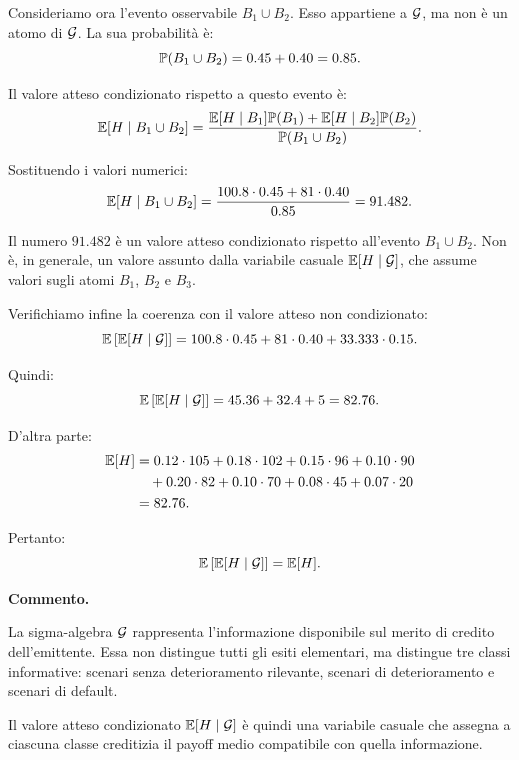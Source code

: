 Consideriamo ora l'evento osservabile $B_1\cup B_2$. Esso appartiene a
$\mathcal{G}$, ma non \`{e} un atomo di $\mathcal{G}$. La sua probabilit\`{a}
\`{e}:
\[
\mathbb{P}(B_1\cup B_2)
=
0.45+0.40
=
0.85.
\]

Il valore atteso condizionato rispetto a questo evento \`{e}:
\[
\mathbb{E}[H\mid B_1\cup B_2]
=
\frac{
\mathbb{E}[H\mid B_1]\mathbb{P}(B_1)
+
\mathbb{E}[H\mid B_2]\mathbb{P}(B_2)
}
{
\mathbb{P}(B_1\cup B_2)
}.
\]

Sostituendo i valori numerici:
\[
\mathbb{E}[H\mid B_1\cup B_2]
=
\frac{
100.8\cdot0.45
+
81\cdot0.40
}
{0.85}
=
91.482.
\]

Il numero $91.482$ \`{e} un valore atteso condizionato rispetto all'evento
$B_1\cup B_2$. Non \`{e}, in generale, un valore assunto dalla variabile
casuale $\mathbb{E}[H\mid\mathcal{G}]$, che assume valori sugli atomi
$B_1$, $B_2$ e $B_3$.

Verifichiamo infine la coerenza con il valore atteso non condizionato:
\[
\mathbb{E}\left[
\mathbb{E}[H\mid\mathcal{G}]
\right]
=
100.8\cdot0.45
+
81\cdot0.40
+
33.333\cdot0.15.
\]

Quindi:
\[
\mathbb{E}\left[
\mathbb{E}[H\mid\mathcal{G}]
\right]
=
45.36+32.4+5
=
82.76.
\]

D'altra parte:
\[
\begin{aligned}
\mathbb{E}[H]
&=
0.12\cdot105
+
0.18\cdot102
+
0.15\cdot96
+
0.10\cdot90 \\
&\quad
+
0.20\cdot82
+
0.10\cdot70
+
0.08\cdot45
+
0.07\cdot20 \\
&=
82.76.
\end{aligned}
\]

Pertanto:
\[
\mathbb{E}\left[
\mathbb{E}[H\mid\mathcal{G}]
\right]
=
\mathbb{E}[H].
\]

\medskip

\noindent
\textbf{Commento.}

La sigma-algebra $\mathcal{G}$ rappresenta l'informazione disponibile sul
merito di credito dell'emittente. Essa non distingue tutti gli esiti
elementari, ma distingue tre classi informative: scenari senza deterioramento
rilevante, scenari di deterioramento e scenari di default.

Il valore atteso condizionato $\mathbb{E}[H\mid\mathcal{G}]$ \`{e} quindi una
variabile casuale che assegna a ciascuna classe creditizia il payoff medio
compatibile con quella informazione.

